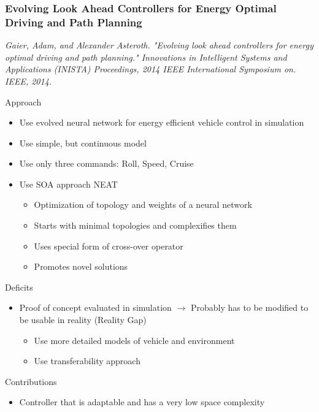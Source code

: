 \documentclass[8pt]{beamer}
\begin{document}
\begin{frame}
	\frametitle{Evolving Look Ahead Controllers for Energy
Optimal Driving and Path Planning}
\textit{Gaier, Adam, and Alexander Asteroth. "Evolving look ahead controllers for energy optimal driving and path planning." Innovations in Intelligent Systems and Applications (INISTA) Proceedings, 2014 IEEE International Symposium on. IEEE, 2014.}\vspace{5mm}

Approach
\begin{itemize}
	\item Use evolved neural network for energy efficient vehicle control in simulation
	\item Use simple, but continuous model
	\item Use only three commands: Roll, Speed, Cruise
	\item Use SOA approach NEAT
	\begin{itemize}
		\item Optimization of topology and weights of a neural network
		\item Starts with minimal topologies and complexifies them
		\item Uses special form of cross-over operator
		\item Promotes novel solutions
	\end{itemize}
	
\end{itemize}
Deficits
\begin{itemize}
	\item Proof of concept evaluated in simulation $\rightarrow$ Probably has to be modified to be usable in reality (Reality Gap)
	\begin{itemize}
		\item Use more detailed models of vehicle and environment
		\item Use transferability approach
	\end{itemize}
\end{itemize}	

Contributions
\begin{itemize}
	\item Controller that is adaptable and has a very low space complexity
\end{itemize}
	
\end{frame}
\end{document}
